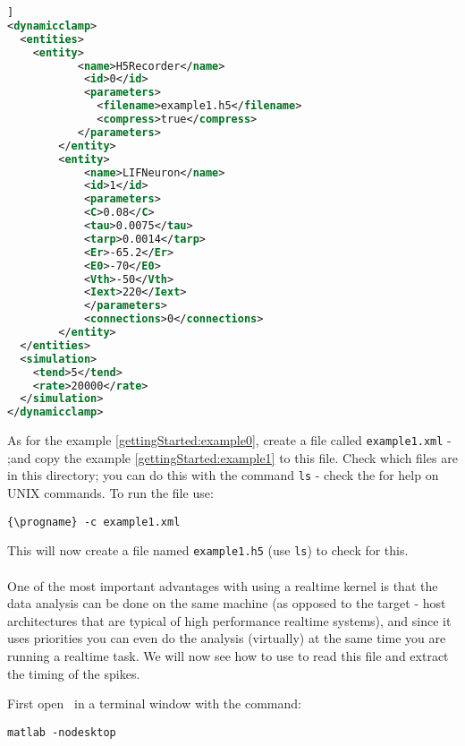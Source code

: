 \begin{lstlisting}[caption={Example of a configuration file with a the H5Recorder entity.},label={gettingStarted:example1},language=XML,morekeywords={dynamic clamp,entities,entity,name,id,filename,compress,C,tau,tarp,Er,E0,Vth,Iext,parameters,connections,simulation,tend,rate}]]
<dynamicclamp>
  <entities>
  	<entity>
 	       <name>H5Recorder</name>
        	<id>0</id>
        	<parameters>
		      <filename>example1.h5</filename>
		      <compress>true</compress>
	       </parameters>
    	</entity>
    	<entity>
      		<name>LIFNeuron</name>
      		<id>1</id>
      		<parameters>
			<C>0.08</C>
			<tau>0.0075</tau>
			<tarp>0.0014</tarp>
			<Er>-65.2</Er>
			<E0>-70</E0>
			<Vth>-50</Vth>
			<Iext>220</Iext>
      		</parameters>
      		<connections>0</connections>
    	</entity>
  </entities>
  <simulation>
  	<tend>5</tend>
   	<rate>20000</rate>
  </simulation>
</dynamicclamp>

\end{lstlisting}

As for the example \ref{gettingStarted:example0}, create a file called \texttt{example1.xml}  - ;and copy the example \ref{gettingStarted:example1} to this file. Check which files are in this directory; you can do this with the command \texttt{ls} - check the  for help on UNIX commands. To run the file use:
\begin{lstlisting}[escapeinside=\{\}]
{\progname} -c example1.xml
\end{lstlisting}

This will now create a file named \texttt{example1.h5} (use \texttt{ls}) to check for this.

\paragraph{} One of the most important advantages with using a realtime kernel is that the data analysis can be done on the same machine (as opposed to the target - host architectures that are typical of high performance realtime systems), and since it uses priorities you can even do the analysis (virtually) at the same time you are running a realtime task. We will now see how to use \textbf{\matlab} to read this file and extract the timing of the spikes. 

First open \matlab\ in a terminal window with the command: 
\begin{lstlisting} 
matlab -nodesktop 
\end{lstlisting}


